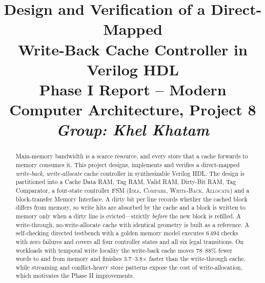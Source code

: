 \documentclass[conference]{IEEEtran}
\begin{document}
\title{Design and Verification of a Direct-Mapped\\Write-Back Cache Controller in Verilog HDL\\
{\large Phase I Report -- Modern Computer Architecture, Project 8}\\ {\large\itshape Group: Khel Khatam}}

\author{
\and
{}
\and
{}
\and
{}
\and
{}
}

\maketitle

\begin{abstract}
Main-memory bandwidth is a scarce resource, and every store that a cache forwards
to memory consumes it. This project designs, implements and verifies a
direct-mapped \emph{write-back, write-allocate} cache controller in synthesizable
Verilog HDL. The design is partitioned into a Cache Data RAM, Tag RAM, Valid RAM,
Dirty-Bit RAM, Tag Comparator, a four-state controller FSM (\textsc{Idle},
\textsc{Compare}, \textsc{Write-Back}, \textsc{Allocate}) and a block-transfer
Memory Interface. A dirty bit per line records whether the cached block differs
from memory, so write hits are absorbed by the cache and a block is written to
memory only when a dirty line is evicted---strictly \emph{before} the new block is
refilled. A write-through, no-write-allocate cache with identical geometry is
built as a reference. A self-checking directed testbench with a golden memory
model executes 6\,494 checks with zero failures and covers all four controller
states and all six legal transitions. On workloads with temporal write locality
the write-back cache moves 78--88\% fewer words to and from memory and finishes
3.7--3.8$\times$ faster than the write-through cache, while streaming and
conflict-heavy store patterns expose the cost of write-allocation, which motivates
the Phase II improvements.
\end{abstract}
\end{document}
